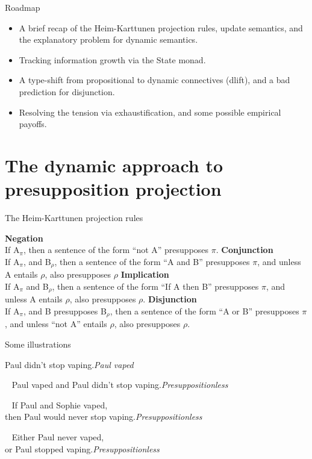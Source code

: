 \documentclass{beamer}
\begin{document}
\begin{frame}{Roadmap}

  \begin{itemize}

      \item A brief recap of the Heim-Karttunen projection rules, update semantics, and the explanatory problem for dynamic semantics.

      \item Tracking information growth via the \textsf{State} monad.

      \item A type-shift from propositional to dynamic connectives (\textsf{dlift}), and a bad prediction for disjunction.

      \item Resolving the tension via exhaustification, and some possible empirical payoffs.

  \end{itemize}

\end{frame}

\section{The dynamic approach to presupposition projection}

\begin{frame}{The Heim-Karttunen projection rules}

  \pex
  \a \textbf{Negation}\\If A\(_π\), then a sentence of the form \enquote{not A} presupposes \(π\).
  \a \textbf{Conjunction}\\If A\(_π\), and B\(_ρ\), then a sentence of the form \enquote{A and B} presupposes \(π\), and unless A entails \(ρ\), also presupposes \(ρ\)
  \a \textbf{Implication}\\If A\(_π\) and B\(_{ρ}\), then a sentence of the form \enquote{If A then B} presupposes \(π\), and unless A entails \(ρ\), also presupposes \(ρ\).
  \a \textbf{Disjunction}\\If A\(_π\), and B presupposes B\(_ρ\), then a sentence of the form \enquote{A or B} presupposes \(π\), and unless \enquote{not A} entails \(ρ\), also presupposes \(ρ\).
  \xe

\end{frame}

\begin{frame}{Some illustrations}

  \ex
  Paul didn't stop vaping.\hfill\textit{Paul vaped}
  \xe

  \ex~
  Paul vaped and Paul didn't stop vaping.\hfill\textit{Presuppositionless}
  \xe

  \ex~
  If Paul and Sophie vaped,\\
  then Paul would never stop vaping.\hfill\textit{Presuppositionless}
  \xe

  \ex~
  Either Paul never vaped,\\
  or Paul stopped vaping.\hfill\textit{Presuppositionless}
  \xe

\end{frame}
\end{document}
